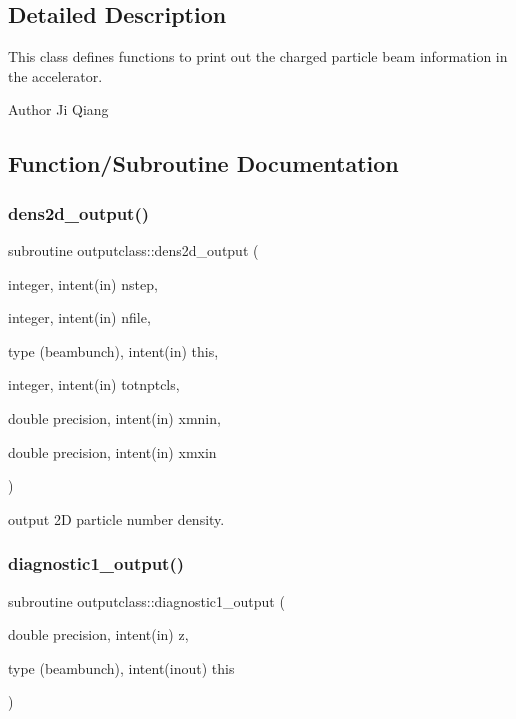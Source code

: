 \subsection{Detailed Description}
This class defines functions to print out the charged particle beam information in the accelerator. 

\begin{DoxyAuthor}{Author}
Ji Qiang 
\end{DoxyAuthor}


\subsection{Function/\+Subroutine Documentation}
\mbox{\label{namespaceoutputclass_ab7f55098e75e7410bbbb6ffa50148508}} 
\subsubsection{\texorpdfstring{dens2d\_output()}{dens2d\_output()}}
{\footnotesize\ttfamily subroutine outputclass\+::dens2d\+\_\+output (\begin{DoxyParamCaption}\item[{integer, intent(in)}]{nstep,  }\item[{integer, intent(in)}]{nfile,  }\item[{type (beambunch), intent(in)}]{this,  }\item[{integer, intent(in)}]{totnptcls,  }\item[{double precision, intent(in)}]{xmnin,  }\item[{double precision, intent(in)}]{xmxin }\end{DoxyParamCaption})}



output 2D particle number density. 

\mbox{\label{namespaceoutputclass_a3b5a43f1652254e5a12880dc332a48c3}} 
\subsubsection{\texorpdfstring{diagnostic1\_output()}{diagnostic1\_output()}}
{\footnotesize\ttfamily subroutine outputclass\+::diagnostic1\+\_\+output (\begin{DoxyParamCaption}\item[{double precision, intent(in)}]{z,  }\item[{type (beambunch), intent(inout)}]{this }\end{DoxyParamCaption})}



